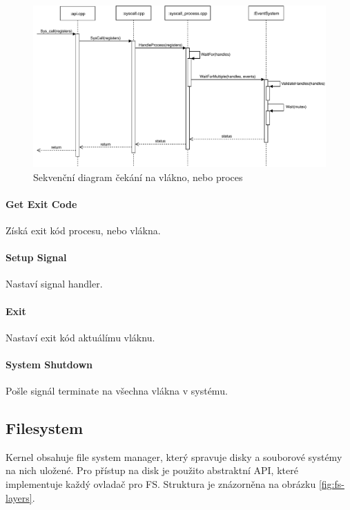 \documentclass[11pt,a4paper]{scrartcl}
\begin{document}
	\begin{figure}[H]
		\centering
		\includegraphics[width=14cm]{wait-for-proc.pdf}
		\caption{Sekvenční diagram čekání na vlákno, nebo proces}
		\label{fig:wait-for-proc}
	\end{figure}
	
	\paragraph{Get Exit Code}
	Získá exit kód procesu, nebo vlákna.
	
	\paragraph{Setup Signal}
	Nastaví signal handler.
	
	\paragraph{Exit}
	Nastaví exit kód aktuálímu vláknu.
	
	\paragraph{System Shutdown}
	Pošle signál terminate na všechna vlákna v systému.

	
	\subsection{Filesystem}
	
	Kernel obsahuje file system manager, který spravuje disky a souborové systémy na nich uložené. Pro přístup na disk je použito abstraktní API, které implementuje každý ovladač pro FS. Struktura je znázorněna na obrázku \ref{fig:fs-layers}. 
	
\end{document}
